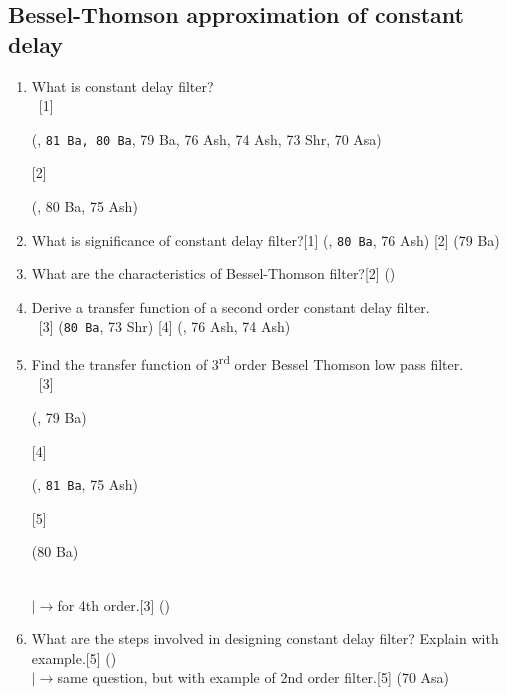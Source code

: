 \documentclass[12pt]{article}
\newcommand{\lb}{\\$\left|\rightarrow\right.$}
\newcommand{\enter}{\\\textcolor{white}{1}}
\begin{document}
		\subsection{Bessel-Thomson approximation of constant delay}
			\begin{enumerate}
				\item What is constant delay filter?
				\enter[1] \begin{footnotesize}(, \texttt{81 Ba, 80 Ba}, 79 Ba, 76 Ash, 74 Ash, 73 Shr, 70 Asa)\end{footnotesize} [2] \begin{footnotesize}(, 80 Ba, 75 Ash)\end{footnotesize}

				\item What is significance of constant delay filter?\hfill[1] (, \texttt{80 Ba}, 76 Ash) [2] (79 Ba)

				\item What are the characteristics of Bessel-Thomson filter?\hfill[2] ()

				\item Derive a transfer function of a second order constant delay filter.
				\enter\hfill[3] (\texttt{80 Ba}, 73 Shr) [4] (, 76 Ash, 74 Ash)

				\item Find the transfer function of 3\textsuperscript{rd} order Bessel Thomson low pass filter.
				\enter \hfill[3] \begin{footnotesize}(, 79 Ba)\end{footnotesize} [4] \begin{footnotesize}(, \texttt{81 Ba}, 75 Ash)\end{footnotesize} [5] \begin{footnotesize}(80 Ba)\end{footnotesize}
				\lb for 4th order.\hfill[3] ()

				\item What are the steps involved in designing constant delay filter? Explain with example.\hfill[5] ()
				\lb same question, but with example of 2nd order filter.\hfill[5] (70 Asa)
			\end{enumerate}
\end{document}
